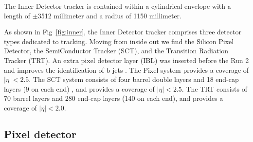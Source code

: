 The Inner Detector tracker is contained within a cylindrical envelope with a length of $\pm$3512 millimeter and a radius of 1150 millimeter.
\par As shown in Fig~\ref{fig:inner}, the Inner Detector tracker comprises three detector types dedicated to tracking. Moving from inside out we find the Silicon Pixel Detector, the SemiConductor Tracker (SCT), and the Transition Radiation Tracker (TRT). An extra pixel detector layer 
(IBL)\cite{Capeans:1291633} 
was inserted before the Run 2 and improves the identification of b-jets \cite{ATL-PHYS-PUB-2015-022}. The Pixel system provides a coverage of $|\eta|<2.5$.
The SCT system consists of four barrel double layers and 18 end-cap layers (9 on each end) \cite{Aad:2014mta}, and provides a coverage of $|\eta| < 2.5$.
The TRT consists of 70 barrel layers and 280 end-cap layers (140 on each end), and provides a coverage of $|\eta| < 2.0$\cite{Aad:2014mta}.


\subsection{Pixel detector}
\label{sec:pixel}


